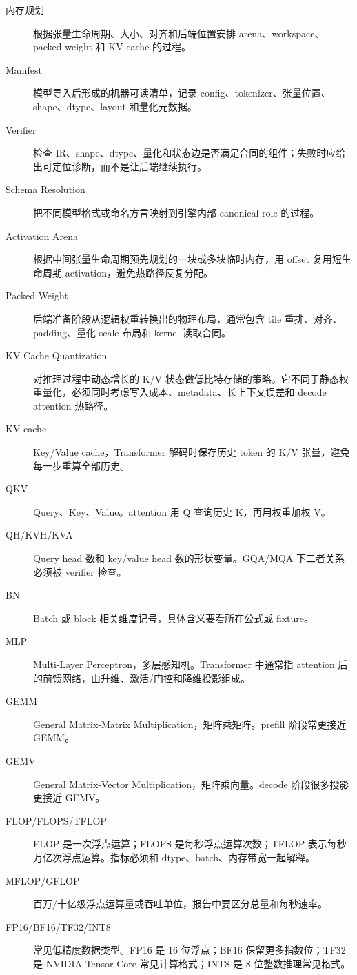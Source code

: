 \begin{description}
  \item[内存规划] 根据张量生命周期、大小、对齐和后端位置安排 arena、workspace、packed weight 和 KV cache 的过程。
  \item[Manifest] 模型导入后形成的机器可读清单，记录 config、tokenizer、张量位置、shape、dtype、layout 和量化元数据。
  \item[Verifier] 检查 IR、shape、dtype、量化和状态边是否满足合同的组件；失败时应给出可定位诊断，而不是让后端继续执行。
  \item[Schema Resolution] 把不同模型格式或命名方言映射到引擎内部 canonical role 的过程。
  \item[Activation Arena] 根据中间张量生命周期预先规划的一块或多块临时内存，用 offset 复用短生命周期 activation，避免热路径反复分配。
  \item[Packed Weight] 后端准备阶段从逻辑权重转换出的物理布局，通常包含 tile 重排、对齐、padding、量化 scale 布局和 kernel 读取合同。
  \item[KV Cache Quantization] 对推理过程中动态增长的 K/V 状态做低比特存储的策略。它不同于静态权重量化，必须同时考虑写入成本、metadata、长上下文误差和 decode attention 热路径。
  \item[KV cache] Key/Value cache，Transformer 解码时保存历史 token 的 K/V 张量，避免每一步重算全部历史。
  \item[QKV] Query、Key、Value。attention 用 Q 查询历史 K，再用权重加权 V。
  \item[QH/KVH/KVA] Query head 数和 key/value head 数的形状变量。GQA/MQA 下二者关系必须被 verifier 检查。
  \item[BN] Batch 或 block 相关维度记号，具体含义要看所在公式或 fixture。
  \item[MLP] Multi-Layer Perceptron，多层感知机。Transformer 中通常指 attention 后的前馈网络，由升维、激活/门控和降维投影组成。
  \item[GEMM] General Matrix-Matrix Multiplication，矩阵乘矩阵。prefill 阶段常更接近 GEMM。
  \item[GEMV] General Matrix-Vector Multiplication，矩阵乘向量。decode 阶段很多投影更接近 GEMV。
  \item[FLOP/FLOPS/TFLOP] FLOP 是一次浮点运算；FLOPS 是每秒浮点运算次数；TFLOP 表示每秒万亿次浮点运算。指标必须和 dtype、batch、内存带宽一起解释。
  \item[MFLOP/GFLOP] 百万/十亿级浮点运算量或吞吐单位，报告中要区分总量和每秒速率。
  \item[FP16/BF16/TF32/INT8] 常见低精度数据类型。FP16 是 16 位浮点；BF16 保留更多指数位；TF32 是 NVIDIA Tensor Core 常见计算格式；INT8 是 8 位整数推理常见格式。

\end{description}
